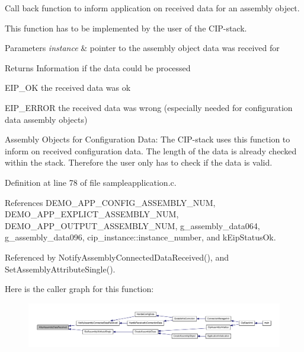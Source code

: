 \-Call back function to inform application on received data for an assembly object. 

\-This function has to be implemented by the user of the \-C\-I\-P-\/stack. 
\begin{DoxyParams}{\-Parameters}
{\em instance} & pointer to the assembly object data was received for \\
\hline
\end{DoxyParams}
\begin{DoxyReturn}{\-Returns}
\-Information if the data could be processed
\begin{DoxyItemize}
\item \-E\-I\-P\-\_\-\-O\-K the received data was ok
\item \-E\-I\-P\-\_\-\-E\-R\-R\-O\-R the received data was wrong (especially needed for configuration data assembly objects)
\end{DoxyItemize}
\end{DoxyReturn}
\-Assembly \-Objects for \-Configuration \-Data\-: \-The \-C\-I\-P-\/stack uses this function to inform on received configuration data. \-The length of the data is already checked within the stack. \-Therefore the user only has to check if the data is valid. 

\-Definition at line 78 of file sampleapplication.\-c.



\-References \-D\-E\-M\-O\-\_\-\-A\-P\-P\-\_\-\-C\-O\-N\-F\-I\-G\-\_\-\-A\-S\-S\-E\-M\-B\-L\-Y\-\_\-\-N\-U\-M, \-D\-E\-M\-O\-\_\-\-A\-P\-P\-\_\-\-E\-X\-P\-L\-I\-C\-T\-\_\-\-A\-S\-S\-E\-M\-B\-L\-Y\-\_\-\-N\-U\-M, \-D\-E\-M\-O\-\_\-\-A\-P\-P\-\_\-\-O\-U\-T\-P\-U\-T\-\_\-\-A\-S\-S\-E\-M\-B\-L\-Y\-\_\-\-N\-U\-M, g\-\_\-assembly\-\_\-data064, g\-\_\-assembly\-\_\-data096, cip\-\_\-instance\-::instance\-\_\-number, and k\-Eip\-Status\-Ok.



\-Referenced by \-Notify\-Assembly\-Connected\-Data\-Received(), and \-Set\-Assembly\-Attribute\-Single().



\-Here is the caller graph for this function\-:
\nopagebreak
\begin{figure}[H]
\begin{center}
\leavevmode
\includegraphics[width=350pt]{d5/dc5/group__CIP__CALLBACK__API_ga5307d18b1bd79f151588391cb4ebf30a_icgraph}
\end{center}
\end{figure}


